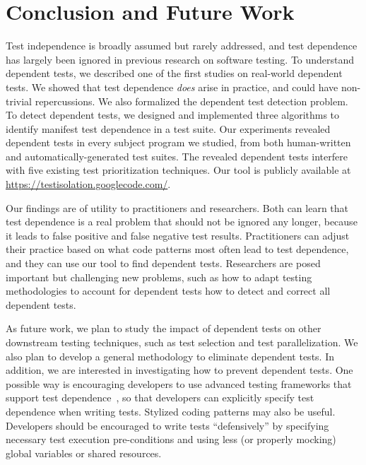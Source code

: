 
\vspace{-1mm}
\section{Conclusion and Future Work}
\label{sec:questions}


Test independence is broadly assumed but rarely addressed, and
test dependence has largely been ignored in previous
research on software testing. 
To understand dependent tests, we described one of the first studies on
real-world dependent tests. We showed that 
test dependence \textit{does} arise in practice, and could 
have non-trivial repercussions. We also
formalized the dependent test detection
problem. To detect dependent tests, we designed
and implemented three algorithms to identify manifest test dependence
in a test suite. Our experiments revealed
dependent tests in every subject program
we studied, from both human-written and automatically-generated test
suites. The revealed dependent tests interfere with
five existing test prioritization techniques.
Our tool is publicly available at
\url{https://testisolation.googlecode.com/}.

Our findings are of utility to practitioners and researchers.
Both can learn that test dependence is a real problem that should not be
ignored any longer, because it leads to false positive and false negative
test results.
Practitioners can adjust their practice based on what code patterns most
often lead to test dependence, and they can use our tool to 
find dependent tests.
Researchers are posed important but challenging new problems, such as how
to adapt testing methodologies to account for dependent tests how to detect
and correct all dependent tests.

\enlargethispage{5pt}

As future work, we plan to study
the impact of dependent tests on other
downstream testing techniques, such as test selection and
test parallelization.
We also plan to develop
a general methodology to eliminate dependent tests.
In addition, we are interested in investigating how to
prevent dependent tests.
%
One possible way is encouraging developers to
use advanced testing frameworks that support test dependence~\cite{testng},
so that developers can explicitly specify test
dependence when writing tests.
%
Stylized coding patterns may also be useful. Developers
should be encouraged to write tests ``defensively'' by
specifying necessary test execution pre-conditions and
using less (or properly mocking) global variables or shared resources. 

